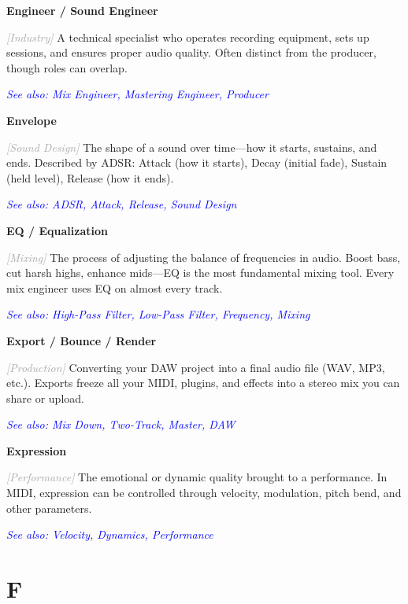 \documentclass[11pt,letterpaper]{article}
\newcommand{\term}[1]{\textbf{\large\color{purple}#1}}
\newcommand{\category}[1]{\textcolor{darkgray}{\textit{\small [#1]}}}
\newcommand{\seealso}[1]{\textcolor{blue}{\textit{See also: #1}}}
\newenvironment{termdef}[1]
  {\noindent\term{#1}\par\nopagebreak}
  {\par\vspace{0.3em}}
\begin{document}
\begin{termdef}{Engineer / Sound Engineer}
\category{Industry}
A technical specialist who operates recording equipment, sets up sessions, and ensures proper audio quality. Often distinct from the producer, though roles can overlap.

\seealso{Mix Engineer, Mastering Engineer, Producer}
\end{termdef}

\begin{termdef}{Envelope}
\category{Sound Design}
The shape of a sound over time—how it starts, sustains, and ends. Described by ADSR: Attack (how it starts), Decay (initial fade), Sustain (held level), Release (how it ends).

\seealso{ADSR, Attack, Release, Sound Design}
\end{termdef}

\begin{termdef}{EQ / Equalization}
\category{Mixing}
The process of adjusting the balance of frequencies in audio. Boost bass, cut harsh highs, enhance mids—EQ is the most fundamental mixing tool. Every mix engineer uses EQ on almost every track.

\seealso{High-Pass Filter, Low-Pass Filter, Frequency, Mixing}
\end{termdef}

\begin{termdef}{Export / Bounce / Render}
\category{Production}
Converting your DAW project into a final audio file (WAV, MP3, etc.). Exports freeze all your MIDI, plugins, and effects into a stereo mix you can share or upload.

\seealso{Mix Down, Two-Track, Master, DAW}
\end{termdef}

\begin{termdef}{Expression}
\category{Performance}
The emotional or dynamic quality brought to a performance. In MIDI, expression can be controlled through velocity, modulation, pitch bend, and other parameters.

\seealso{Velocity, Dynamics, Performance}
\end{termdef}

\newpage


\section*{F}
\end{document}
